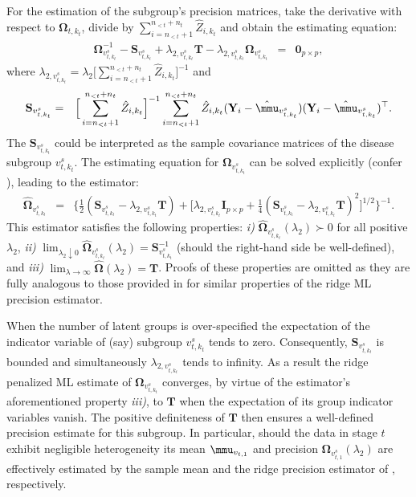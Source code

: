 \documentclass[10pt]{article}
\begin{document}
For the estimation of the subgroup's precision matrices, take the derivative with respect to $\mathbf{\Omega}_{t,k_t}$, divide by $\sum_{i=n_{<t} + 1}^{n_{<t} + n_t} \hat{Z}_{i, k_t} $ and obtain the estimating equation:
\begin{eqnarray*}
\mathbf{\Omega}_{v_{t, k_t}^s}^{-1} - \mathbf{S}_{v_{t, k_t}^s} + \lambda_{2, v_{t, k_t}^s} \mathbf{T} - \lambda_{2, v_{t, k_t}^s} \mathbf{\Omega}_{v_{t, k_t}^s} & = & \mathbf{0}_{p \times p},
\end{eqnarray*}
where  $\lambda_{2, v_{t, k_t}^s} = \lambda_2 \big[ \sum_{i=n_{<t} + 1}^{n_{<t} + n_t} \hat{Z}_{i, k_t}  \big]^{-1}$ and
\begin{eqnarray*}
\mathbf{S}_{v_{t, k_t}^s} & = & \Big[  \sum_{i=n_{<t} + 1}^{n_{<t} + n_t} \hat{Z}_{i, k_t}  \Big]^{-1}  \sum_{i=n_{<t} + 1}^{n_{<t} + n_t} \hat{Z}_{i, k_t}  (\mathbf{Y}_i - \hat{\mmu}_{v_{t, k_t}^s}) (\mathbf{Y}_{i} - \hat{\mmu}_{v_{t, k_t}^s})^{\top}.
\end{eqnarray*}
The $\mathbf{S}_{v_{t, k_t}^s}$ could be interpreted as the sample covariance matrices of the disease subgroup $v_{t, k_t}^s$. The estimating equation for $\mathbf{\Omega}_{v_{t, k_t}^s}$ can be solved explicitly (confer \citealp{VWie2014b}), leading to the estimator:
\begin{eqnarray}
\widehat{\mathbf{\Omega}}_{v_{t, k_t}^s} & = & \Big\{ \frac{1}{2} ( \mathbf{S}_{v_{t, k_t}^s}  - \lambda_{2, v_{t, k_t}^s} \mathbf{T} ) + \Big[\lambda_{2, v_{t, k_t}^s} \mathbf{I}_{p \times p} + \frac{1}{4} (\mathbf{S}_{v_{t, k_t}^s} - \lambda_{2,v_{t, k_t}^s} \mathbf{T})^2 \Big]^{1/2}  \Big\}^{-1}.
\label{est:omega}
\end{eqnarray}
This estimator satisfies the following properties: \textit{i)} $\widehat{\mathbf{\Omega}}_{v_{t, k_t}^s}(\lambda_2) \succ 0$ for all positive $\lambda_2$, \textit{ii)} $\lim_{\lambda_2 \downarrow 0}  \widehat{\mathbf{\Omega}}_{v_{t, k_t}^s} (\lambda_2) = \mathbf{S}_{v_{t, k_t}^s}^{-1}$ (should the right-hand side be well-defined), and \textit{iii)} $\lim_{\lambda\rightarrow \infty} \widehat{\mathbf{\Omega}}(\lambda_2)= \mathbf{T}$. Proofs of these properties are omitted as they are fully analogous to those provided in \cite{VWie2016a} for similar properties of the ridge ML precision estimator.

When the number of latent groups is over-specified the expectation of the indicator variable of (say) subgroup $v_{t, k_t}^s$ tends to zero. Consequently, $\mathbf{S}_{v_{t, k_t}^s}$ is bounded and simultaneously $\lambda_{2, v_{t, k_t}^s}$ tends to infinity. As a result the ridge penalized ML estimate of $\mathbf{\Omega}_{v_{t, k_t}^s}$ converges, by virtue of the estimator's aforementioned property \textit{iii)}, to $\mathbf{T}$ when the expectation of its group indicator variables vanish. The positive definiteness of $\mathbf{T} $ then ensures a well-defined precision estimate for this subgroup. In particular, should the data in stage $t$ exhibit negligible heterogeneity its mean $\mmu_{v_{t,1}}$ and precision $\mathbf{\Omega}_{v_{t, 1}^s}(\lambda_2)$ are effectively estimated by the sample mean and the ridge precision estimator of \cite{VWie2014b}, respectively.
\end{document}
